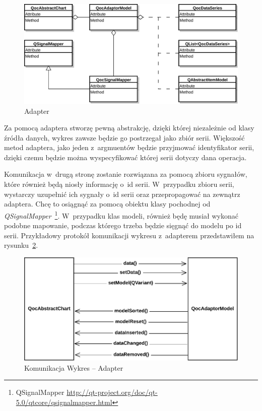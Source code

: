 \begin{figure}[H]
\centering
\includegraphics[scale=0.8]{img/adapter-model.pdf}
\caption{Adapter}\label{rys:adapter:model}
\end{figure}

Za pomocą adaptera stworzę pewną abstrakcję, dzięki której niezależnie od klasy źródła danych, wykres zawsze będzie go postrzegał jako zbiór serii. Większość metod adaptera, jako jeden z~argmuentów będzie przyjmować identyfikator serii, dzięki czemu będzie można wyspecyfikować  której serii dotyczy dana operacja. 

Komunikacja w~drugą stronę zostanie rozwiązana za pomocą zbioru sygnałów, które również będą niosły informację o~id serii. W~przypadku zbioru serii, wystarczy uzupełnić ich sygnały o~id serii oraz przepropagować na zewnątrz adaptera. Chcę to osiągnąć za pomocą obiektu klasy pochodnej od \textit{QSignalMapper}~\footnote{QSignalMapper \url{http://qt-project.org/doc/qt-5.0/qtcore/qsignalmapper.html}}. W~przypadku klas modeli, również będę musiał wykonać podobne mapowanie, podczas którego trzeba będzie sięgnąć do modelu po id serii. Przykładowy protokół komunikacji wykresu z~adapterem przedstawiłem na rysunku~\ref{rys:wykres:model}.

\begin{figure}[H]
\centering
\includegraphics[scale=0.8]{img/wykres-model.pdf}
\caption{Komunikacja Wykres -- Adapter}\label{rys:wykres:model}
\end{figure}

